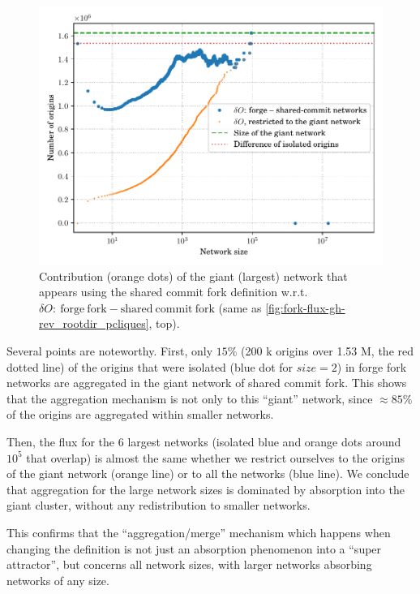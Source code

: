 \begin{figure}
    \centering
    \includegraphics[width=0.6\linewidth]{img/forks/wccdf-forges-swhrev-giant-network.pdf}
    \caption{Contribution (orange dots) of the giant (largest) network that
    appears using the shared commit fork definition w.r.t.
    $\delta O:~\mathrm{forge~fork} - \mathrm{shared~commit~fork}$ (same as
    \cref{fig:fork-flux-gh-rev_rootdir_pcliques}, top).}%
    \label{fig:fork-Diff_WCCDF_all}
\end{figure}

Several points are noteworthy.
First, only $15\%$ (200 k origins over 1.53 M, the red dotted line) of the
origins that were isolated (blue dot for $size=2$) in forge fork networks
are aggregated in the giant network of shared commit fork.
This shows that the aggregation mechanism is not only to this ``giant''
network, since $\approx 85\%$ of the origins are aggregated within smaller
networks.

Then, the flux for the 6 largest networks (isolated blue and orange dots around
$10^5$ that overlap) is almost the same whether we restrict ourselves to the
origins of the giant network (orange line) or to all the networks (blue line).
We conclude that aggregation for the large network sizes is dominated by
absorption into the giant cluster, without any redistribution to smaller
networks.

This confirms that the ``aggregation/merge'' mechanism which happens when
changing the definition is not just an absorption phenomenon into a ``super
attractor'', but concerns all network sizes, with larger networks absorbing
networks of any size.



